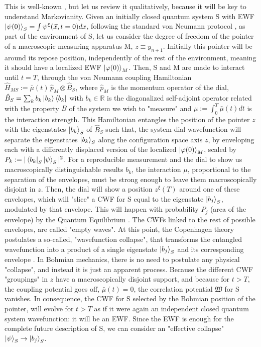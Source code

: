 \documentclass[11pt, a4paper]{article} %
\newcommand{\R}{\mathbb{R}} %
\begin{document}
This is well-known \cite{Durr, Absolute, operatorsObservables}, but let us review it qualitatively, because it will be key to understand Markovianity. Given an initially closed quantum system S with EWF $\ket{\psi(0)}_S=\int\psi^\xi(\vec{x},t=0)dx$, following the standard von Neumann protocol \cite{vonNeumann}, as part of the environment of S, let us consider the degree of freedom of the pointer of a macroscopic measuring apparatus M, $z\equiv y_{n+1}$. Initially this pointer will be around its repose position, independently of the rest of the environment, meaning it should have a localized EWF $\ket{\varphi(0)}_M$. Then, S and M are made to interact until $t=T$, through the von Neumann coupling Hamiltonian $\hat{H}_{MS}:=\bar{\mu}(t)\,\hat{p}_M\otimes \hat{B}_S$, where $\hat{p}_M$ is the momentum operator of the dial, $\hat{B}_S=\sum_kb_k\ket{b_k}\bra{b_k}$ with $b_k\in\R$ is the diagonalized self-adjoint operator related with the property $B$ of the system we wish to "measure" and $\mu:=\int_0^T\bar{\mu}(t)dt$ is the interaction strength. This Hamiltonian entangles the position of the pointer $z$ with the eigenstates $\ket{b_k}_S$ of $\hat{B}_S$ such that, the system-dial wavefunction will separate the eigenstates $\ket{b_k}_S$ along the configuration space axis $z$, by enveloping each with a differently displaced version of the localized $\ket{\varphi(0)}_M$, scaled by $P_k:=|\bra{b_k}_S\ket{\psi}_S|^2$. For a reproducible measurement \cite{operatorsObservables} and the dial to show us macroscopically distinguishable results $b_k$, the interaction $\mu$, proportional to the separation of the envelopes, must be strong enough to leave them macroscopically disjoint in $z$. Then, the dial will show a position $z^\xi(T)$ around one of these envelopes, which will "slice" a CWF for S equal to the eigenstate $\ket{b_j}_S$, modulated by that envelope. This will happen with probability $P_j$ (area of the envelope) by the Quantum Equilibrium \cite{Absolute}. The CWFs linked to the rest of possible envelopes, are called "empty waves". At this point, the Copenhagen theory postulates a so-called, "wavefunction collapse", that transforms the entangled wavefunction into a product of a single eigenstate $\ket{b_j}_S$ and its corresponding envelope \cite{vonNeumann}. In Bohmian mechanics, there is no need to postulate any physical "collapse", and instead it is just an apparent process. Because the different CWF "groupings" in $z$ have a macroscopically disjoint support, and because for $t>T$, the coupling potential goes off, $\bar{\mu}(t)=0$, the correlation potential $\mathfrak{W}$ for S vanishes. In consequence, the CWF for S selected by the Bohmian position of the pointer, will evolve for $t>T$ as if it were again an independent closed quantum system wavefunction: it will be an EWF. Since the EWF is enough for the complete future description of S, we can consider an "effective collapse" $\ket{\psi}_S\rightarrow\ket{b_j}_S$.
\end{document}
